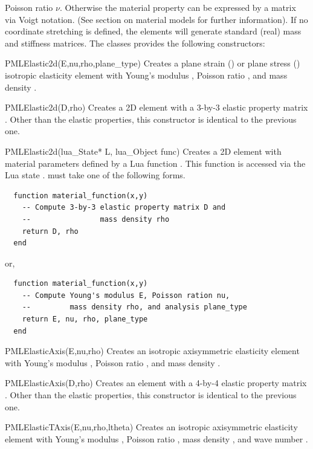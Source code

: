 Poisson ratio $\nu$. Otherwise the material property can be expressed
by a matrix via Voigt notation. (See section on material models for
further information).
 If no coordinate stretching is 
defined, the elements will generate standard (real) mass and 
stiffness matrices.
The classes provides the following constructors:
\begin{codelist}

  \item[PMLElastic2d(E,nu,rho,plane\_type)]
    Creates a plane strain () or plane stress
    () isotropic elasticity element with
    Young's modulus , Poisson ratio , and mass
    density .  

  \item[PMLElastic2d(D,rho)]
    Creates a 2D element with a 3-by-3 elastic property matrix
    .  Other than the elastic properties, this constructor
    is identical to the previous one.

  \item[PMLElastic2d(lua\_State* L, lua\_Object func)]
    Creates a 2D element with material parameters defined by a
    Lua function . This function is accessed via the 
    Lua state .  must take one of the following
    forms. 
    \begin{verbatim}
  function material_function(x,y)
    -- Compute 3-by-3 elastic property matrix D and 
    --                mass density rho
    return D, rho
  end
    \end{verbatim}
    or,
    \begin{verbatim}
  function material_function(x,y)
    -- Compute Young's modulus E, Poisson ration nu, 
    --         mass density rho, and analysis plane_type
    return E, nu, rho, plane_type
  end
    \end{verbatim}
  
  \item[PMLElasticAxis(E,nu,rho)]
    Creates an isotropic axisymmetric elasticity element with
    Young's modulus , Poisson ratio , and mass
    density .  

  \item[PMLElasticAxis(D,rho)]
    Creates an element with a 4-by-4 elastic property matrix
    .  Other than the elastic properties, this constructor
    is identical to the previous one.

  \item[PMLElasticTAxis(E,nu,rho,ltheta)]
    Creates an isotropic axisymmetric elasticity element with
    Young's modulus , Poisson ratio , mass
    density , and wave number .


\end{codelist}
